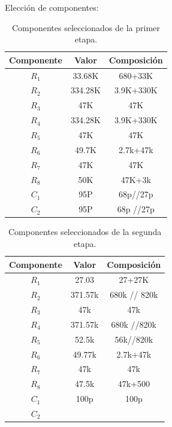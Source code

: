 Elección de componentes:
\begin{table}[H]
\centering
\begin{tabular}{ccc}
\hline
\multicolumn{1}{c}{Componente} & \multicolumn{1}{c}{Valor} & Composición \\ \hline
$R_1$                           & 33.68K                     & 680+33K     \\
$R_2$                           & 334.28K                    & 3.9K+330K   \\
$R_3$                           & 47K                        & 47K         \\
$R_4$                           & 334.28K                    & 3.9K+330K   \\
$R_5$                           & 47K                        & 47K         \\
$R_6$                           & 49.7K                        & 2.7k+47k         \\
$R_7$                           & 47K                        & 47K         \\
$R_8$                           & 50K                        & 47K+3k         \\
$C_1$                           & 95P                        & 68p//27p     \\
$C_2$                           & 95P                        & 68p //27p    \\
\hline
\end{tabular}
\caption{Componentes seleccionados de la primer etapa.}
\end{table}

\begin{table}[H]
\centering
\begin{tabular}{ccc}
\hline
\multicolumn{1}{c}{Componente} & \multicolumn{1}{c}{Valor} & Composición  \\ \hline
$R_1$                           & 27.03                      & 27+27K      \\
$R_2$                           & 371.57k                    & 680k // 820k \\
$R_3$                           & 47k                        & 47k          \\
$R_4$                           & 371.57k                    & 680k //820k   \\
$R_5$                           & 52.5k                      & 56k//820k    \\
$R_6$                           & 49.77k                     & 2.7k+47k     \\
$R_7$                           & 47k                        & 47k          \\
$R_8$                           & 47.5k                        & 47k+500          \\
$C_1$                           & 100p                       & 100p         \\
$C_2$  \\
\hline
\end{tabular}
\caption{Componentes seleccionados de la segunda etapa.}
\end{table}


